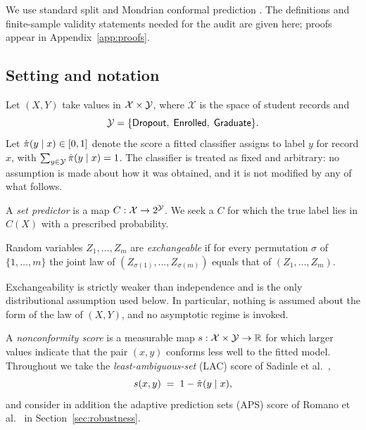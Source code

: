 We use standard split and Mondrian conformal prediction
\cite{vovk2005,papadopoulos2002,vovk2003mondrian}. The definitions and
finite-sample validity statements needed for the audit are given here;
proofs appear in Appendix~\ref{app:proofs}.

\subsection{Setting and notation}

Let $(X, Y)$ take values in $\mathcal{X} \times \mathcal{Y}$, where $\mathcal{X}$ is
the space of student records and
\[
\mathcal{Y} = \{\textsf{Dropout},\; \textsf{Enrolled},\; \textsf{Graduate}\}.
\]
Let $\hat{\pi}(y \mid x) \in [0,1]$ denote the score a fitted classifier assigns
to label $y$ for record $x$, with $\sum_{y \in \mathcal{Y}} \hat{\pi}(y \mid x) = 1$. The
classifier is treated as fixed and arbitrary: no assumption is made about how it
was obtained, and it is not modified by any of what follows.

A \emph{set predictor} is a map $C : \mathcal{X} \to 2^{\mathcal{Y}}$. We seek a
$C$ for which the true label lies in $C(X)$ with a prescribed probability.

\begin{definition}
Random variables $Z_1,\dots,Z_m$ are \emph{exchangeable} if for every
permutation $\sigma$ of $\{1,\dots,m\}$ the joint law of
$(Z_{\sigma(1)},\dots,Z_{\sigma(m)})$ equals that of $(Z_1,\dots,Z_m)$.
\end{definition}

Exchangeability is strictly weaker than independence and is the only
distributional assumption used below. In particular, nothing is assumed about
the form of the law of $(X,Y)$, and no asymptotic regime is invoked.

\begin{definition}
A \emph{nonconformity score} is a measurable map
$s : \mathcal{X} \times \mathcal{Y} \to \mathbb{R}$ for which larger values indicate
that the pair $(x,y)$ conforms less well to the fitted model. Throughout we take
the \emph{least-ambiguous-set} (LAC) score of Sadinle et al.~\cite{sadinle2019},
\begin{equation}
s(x, y) \;=\; 1 - \hat{\pi}(y \mid x) ,
\label{eq:lac}
\end{equation}
and consider in addition the adaptive prediction sets (APS) score of Romano et
al.~\cite{romano2020} in Section~\ref{sec:robustness}.
\end{definition}


